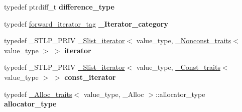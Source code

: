 \begin{DoxyCompactItemize}
\mbox{\label{classslist_afe887349efa14b7b924df460ce73eeae}} 
typedef ptrdiff\+\_\+t {\bfseries difference\+\_\+type}
\item 
\mbox{\label{classslist_a9ca5a6dde57031c7ac0b2d98cb5b2cb9}} 
typedef \hyperlink{structforward__iterator__tag}{forward\+\_\+iterator\+\_\+tag} {\bfseries \+\_\+\+Iterator\+\_\+category}
\item 
\mbox{\label{classslist_a356102fbc7f5c012d2db31ecd95dec20}} 
typedef \+\_\+\+S\+T\+L\+P\+\_\+\+P\+R\+IV \hyperlink{class___slist__iterator}{\+\_\+\+Slist\+\_\+iterator}$<$ value\+\_\+type, \hyperlink{struct___nonconst__traits}{\+\_\+\+Nonconst\+\_\+traits}$<$ value\+\_\+type $>$ $>$ {\bfseries iterator}
\item 
\mbox{\label{classslist_a7a78c19c81352bafee1ace7ab9fa3253}} 
typedef \+\_\+\+S\+T\+L\+P\+\_\+\+P\+R\+IV \hyperlink{class___slist__iterator}{\+\_\+\+Slist\+\_\+iterator}$<$ value\+\_\+type, \hyperlink{struct___const__traits}{\+\_\+\+Const\+\_\+traits}$<$ value\+\_\+type $>$ $>$ {\bfseries const\+\_\+iterator}
\item 
\mbox{\label{classslist_a00c9f7020821d092598702e06eedcb67}} 
typedef \hyperlink{struct___alloc__traits}{\+\_\+\+Alloc\+\_\+traits}$<$ value\+\_\+type, \+\_\+\+Alloc $>$\+::allocator\+\_\+type {\bfseries allocator\+\_\+type}
\end{DoxyCompactItemize}
